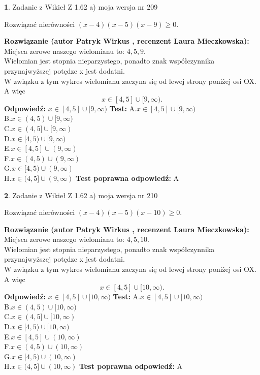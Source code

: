 \documentclass[12pt, a4paper]{article}
\theoremstyle{definition} %
\newtheorem{zad}{}
\newcommand{\zadStart}[1]{\begin{zad}#1\newline}
\newcommand{\zadStop}{\end{zad}}
\newcommand{\rozwStart}[2]{\noindent \textbf{Rozwiązanie (autor #1 , recenzent #2): }\newline}
\newcommand{\rozwStop}{\newline}
\newcommand{\odpStart}{\noindent \textbf{Odpowiedź:}\newline}
\newcommand{\odpStop}{\newline}
\newcommand{\testStart}{\noindent \textbf{Test:}\newline}
\newcommand{\testStop}{\newline}
\newcommand{\kluczStart}{\noindent \textbf{Test poprawna odpowiedź:}\newline}
\newcommand{\kluczStop}{\newline}
\begin{document}
\zadStart{Zadanie z Wikieł Z 1.62 a) moja wersja nr 209}

Rozwiązać nierówności $(x-4)(x-5)(x-9)\ge0$.
\zadStop
\rozwStart{Patryk Wirkus}{Laura Mieczkowska}
Miejsca zerowe naszego wielomianu to: $4, 5, 9$.\\
Wielomian jest stopnia nieparzystego, ponadto znak współczynnika przy\linebreak najwyższej potędze x jest dodatni.\\ W związku z tym wykres wielomianu zaczyna się od lewej strony poniżej osi OX. A więc $$x \in [4,5] \cup [9,\infty).$$
\rozwStop
\odpStart
$x \in [4,5] \cup [9,\infty)$
\odpStop
\testStart
A.$x \in [4,5] \cup [9,\infty)$\\
B.$x \in (4,5) \cup [9,\infty)$\\
C.$x \in (4,5] \cup [9,\infty)$\\
D.$x \in [4,5) \cup [9,\infty)$\\
E.$x \in [4,5] \cup (9,\infty)$\\
F.$x \in (4,5) \cup (9,\infty)$\\
G.$x \in [4,5) \cup (9,\infty)$\\
H.$x \in (4,5] \cup (9,\infty)$
\testStop
\kluczStart
A
\kluczStop



\zadStart{Zadanie z Wikieł Z 1.62 a) moja wersja nr 210}

Rozwiązać nierówności $(x-4)(x-5)(x-10)\ge0$.
\zadStop
\rozwStart{Patryk Wirkus}{Laura Mieczkowska}
Miejsca zerowe naszego wielomianu to: $4, 5, 10$.\\
Wielomian jest stopnia nieparzystego, ponadto znak współczynnika przy\linebreak najwyższej potędze x jest dodatni.\\ W związku z tym wykres wielomianu zaczyna się od lewej strony poniżej osi OX. A więc $$x \in [4,5] \cup [10,\infty).$$
\rozwStop
\odpStart
$x \in [4,5] \cup [10,\infty)$
\odpStop
\testStart
A.$x \in [4,5] \cup [10,\infty)$\\
B.$x \in (4,5) \cup [10,\infty)$\\
C.$x \in (4,5] \cup [10,\infty)$\\
D.$x \in [4,5) \cup [10,\infty)$\\
E.$x \in [4,5] \cup (10,\infty)$\\
F.$x \in (4,5) \cup (10,\infty)$\\
G.$x \in [4,5) \cup (10,\infty)$\\
H.$x \in (4,5] \cup (10,\infty)$
\testStop
\kluczStart
A
\kluczStop
\end{document}
